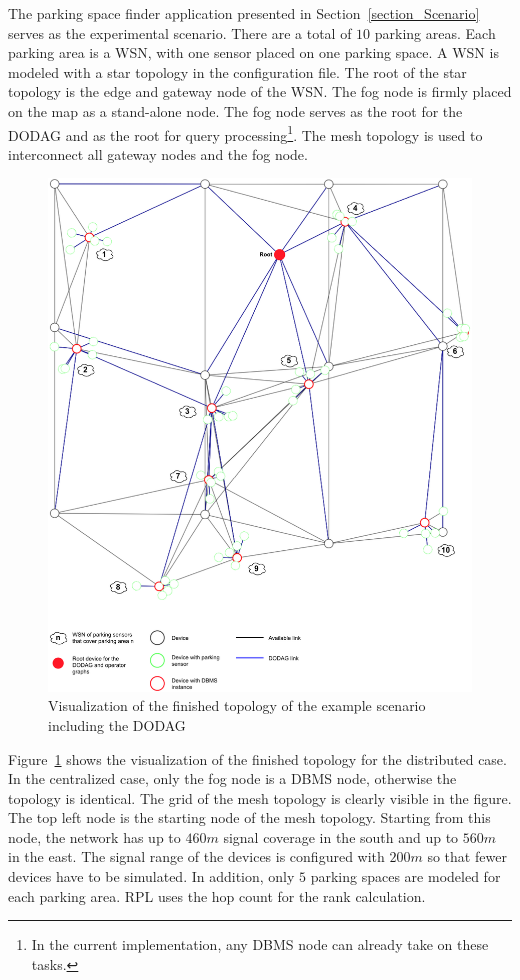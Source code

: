 \documentclass[english,version-2019-11]{uzl-thesis}
\begin{document}
The parking space finder application presented in Section~\ref{section_Scenario} serves as the experimental scenario. There are a total of $10$ parking areas. Each parking area is a WSN, with one sensor placed on one parking space. A WSN is modeled with a star topology in the configuration file.
The root of the star topology is the edge and gateway node of the WSN. The fog node is firmly placed on the map as a stand-alone node. The fog node serves as the root for the DODAG and as the root for query processing\footnote{In the current implementation, any DBMS node can already take on these tasks.}.
The mesh topology is used to interconnect all gateway nodes and the fog node.
\begin{figure}[htpb]
  \centering
  \includegraphics[scale=0.6]{figure_evaluation_visualization.pdf}
  \caption{Visualization of the finished topology of the example scenario including the DODAG}
  \label{figure_evaluation_visualization}
\end{figure}

Figure~\ref{figure_evaluation_visualization} shows the visualization of the finished topology for the distributed case. In the centralized case, only the fog node is a DBMS node, otherwise the topology is identical. The grid of the mesh topology is clearly visible in the figure. The top left node is the starting node of the mesh topology. Starting from this node, the network has up to $460m$ signal coverage in the south and up to $560m$ in the east. The signal range of the devices is configured with $200m$ so that fewer devices have to be simulated. In addition, only $5$ parking spaces are modeled for each parking area. RPL uses the hop count for the rank calculation.
\end{document}
